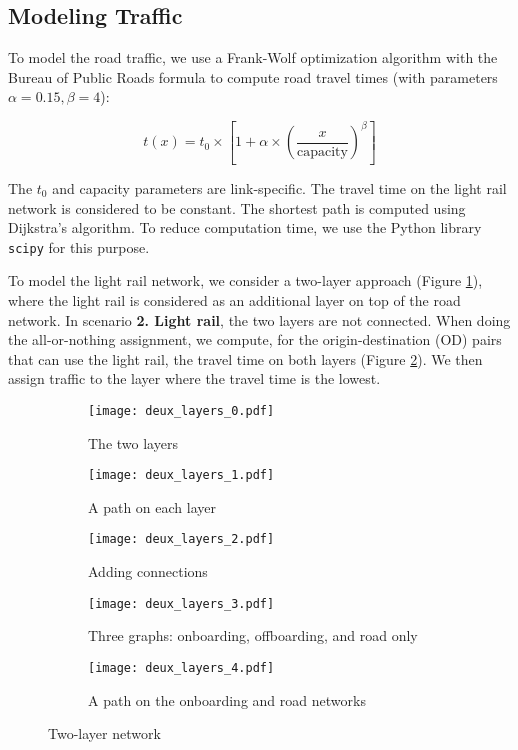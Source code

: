 \subsection{Modeling Traffic}

To model the road traffic, we use a Frank-Wolf optimization algorithm with the Bureau of Public Roads formula to compute road travel times (with parameters $\alpha = 0.15, \beta = 4$): 

\begin{equation}
    t(x) = t_0 \times \left [ 1 + \alpha \times \left (\frac{x}{\text{capacity}} \right )^\beta \right ]
\end{equation}

The $t_0$ and capacity parameters are link-specific. The travel time on the light rail network is considered to be constant. The shortest path is computed using Dijkstra's algorithm. To reduce computation time, we use the Python library \texttt{scipy} for this purpose.

To model the light rail network, we consider a two-layer approach (Figure \ref{fig:2layer_0}), where the light rail is considered as an additional layer on top of the road network. In scenario \textbf{2. Light rail}, the two layers are not connected. When doing the all-or-nothing assignment, we compute, for the origin-destination (OD) pairs that can use the light rail, the travel time on both layers (Figure \ref{fig:2layer_1}). We then assign traffic to the layer where the travel time is the lowest.

\begin{figure}
    \centering
    \begin{subfigure}{0.33\textwidth}
        \centering
        \texttt{[image: deux\_layers\_0.pdf]}
        \caption{The two layers}
        \label{fig:2layer_0}
    \end{subfigure}%
    \begin{subfigure}{0.33\textwidth}
        \centering
        \texttt{[image: deux\_layers\_1.pdf]}
        \caption{A path on each layer}
        \label{fig:2layer_1}
    \end{subfigure}
    \begin{subfigure}{0.33\textwidth}
        \centering
        \texttt{[image: deux\_layers\_2.pdf]}
        \caption{Adding connections\\}
        \label{fig:2layer_2}
    \end{subfigure}%
    \begin{subfigure}{0.33\textwidth}
        \centering
        \texttt{[image: deux\_layers\_3.pdf]}
        \caption{Three graphs: onboarding, offboarding, and road only
        \label{fig:2layer_3}}
    \end{subfigure}%
    \begin{subfigure}{0.33\textwidth}
        \centering
        \texttt{[image: deux\_layers\_4.pdf]}
        \caption{A path on the onboarding and road networks}
        \label{fig:2layer_4}
    \end{subfigure}%
    \caption{Two-layer network}
\end{figure}

